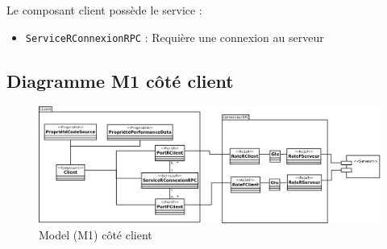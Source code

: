 Le composant client possède le service : 
\begin{itemize}
\item 
  \verb+ServiceRConnexionRPC+ : Requière une connexion au serveur
\end{itemize}
\subsection{Diagramme M1 côté client}
\begin{figure}[htb]
  \centering
  \includegraphics[scale=0.27]{img/M11}
  \caption{Model (M1) côté client}
  \label{fig:M11}
\end{figure}

